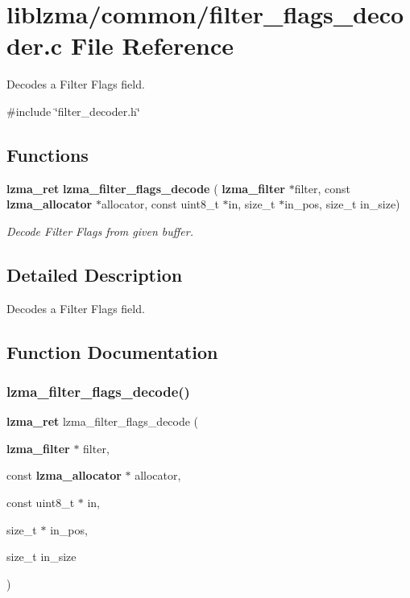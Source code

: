 \section{liblzma/common/filter\+\_\+flags\+\_\+decoder.c File Reference}
\label{filter__flags__decoder_8c}


Decodes a Filter Flags field.  


{\ttfamily \#include \char`\"{}filter\+\_\+decoder.\+h\char`\"{}}\newline
\subsection*{Functions}
\begin{DoxyCompactItemize}
\item 
\textbf{ lzma\+\_\+ret} \textbf{ lzma\+\_\+filter\+\_\+flags\+\_\+decode} (\textbf{ lzma\+\_\+filter} $\ast$filter, const \textbf{ lzma\+\_\+allocator} $\ast$allocator, const uint8\+\_\+t $\ast$in, size\+\_\+t $\ast$in\+\_\+pos, size\+\_\+t in\+\_\+size)
\begin{DoxyCompactList}\small\item\em Decode Filter Flags from given buffer. \end{DoxyCompactList}\end{DoxyCompactItemize}


\subsection{Detailed Description}
Decodes a Filter Flags field. 



\subsection{Function Documentation}
\mbox{\label{filter__flags__decoder_8c_aaacd9dbd1efdd9d4089b7a62a2905fc8}} 
\subsubsection{lzma\+\_\+filter\+\_\+flags\+\_\+decode()}
{\footnotesize\ttfamily \textbf{ lzma\+\_\+ret} lzma\+\_\+filter\+\_\+flags\+\_\+decode (\begin{DoxyParamCaption}\item[{\textbf{ lzma\+\_\+filter} $\ast$}]{filter,  }\item[{const \textbf{ lzma\+\_\+allocator} $\ast$}]{allocator,  }\item[{const uint8\+\_\+t $\ast$}]{in,  }\item[{size\+\_\+t $\ast$}]{in\+\_\+pos,  }\item[{size\+\_\+t}]{in\+\_\+size }\end{DoxyParamCaption})}




